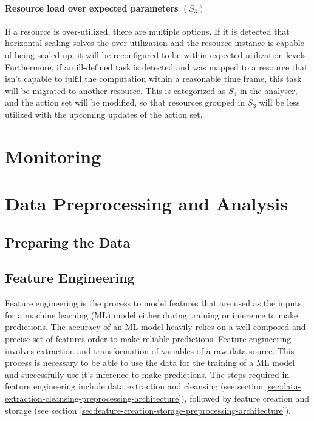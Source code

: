 \paragraph*{Resource load over expected parameters $(S_3)$} 
If a resource is over-utilized, there are multiple options. If it is detected that horizontal scaling solves the over-utilization and the resource instance is capable of being scaled up, it will be reconfigured to be within expected utilization levels. Furthermore, if an ill-defined task is detected and was mapped to a resource that isn't capable to fulfil the computation within a reasonable time frame, this task will be migrated to another resource. 
This is categorized as $S_3$ in the analyser, and the action set will be modified, so that resources grouped in $S_3$ will be less utilized with the upcoming updates of the action set. \cite{kimovskiBigDataPipeline2022}


\section{Monitoring}
\label{sec:monitoring-architecture}

\section{Data Preprocessing and Analysis}
\label{sec:data-preprocessing-and-analysis-architecture}

  \subsection{Preparing the Data}
  \label{sec:preparing-the-data-preprocessing-architecture}

  \subsection{Feature Engineering}
  \label{sec:feature-engineering-data-preprocessing-architecture}

    Feature engineering is the process to model features that are used as the inputs for a machine learning (ML) model either during training or inference to make predictions.
    The accuracy of an ML model heavily relies on a well composed and precise set of features order to make reliable predictions.
    Feature engineering involves extraction and transformation of variables of a raw data source. This process is necessary to be able to use the data for the training of a ML model and successfully use it's inference to make predictions.
    The steps required in feature engineering include data extraction and cleansing (see section \ref{sec:data-extraction-cleansing-preprocessing-architecture}), followed by feature creation and storage (see section \ref{sec:feature-creation-storage-preprocessing-architecture}).

